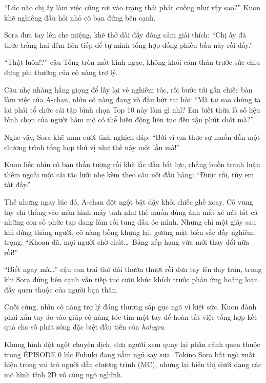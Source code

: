 \documentclass[../main.tex]{subfiles}
\begin{document}
``Lúc nào chị ấy làm việc cũng rơi vào trạng thái phát cuồng như vậy sao?'' Kuon khẽ nghiêng đầu hỏi nhỏ cô bạn đứng bên cạnh.

Sora đưa tay lên che miệng, khẽ thở dài đầy đồng cảm giải thích: ``Chị ấy đã thức trắng hai đêm liên tiếp để tự mình tổng hợp đống phiếu bầu này rồi đấy.''

``Thật luôn!?'' cậu Tổng tròn mắt kinh ngạc, không khỏi cảm thán trước sức chịu đựng phi thường của cô nàng trợ lý.

Cậu nhẹ nhàng hắng giọng để lấy lại vẻ nghiêm túc, rồi bước tới gần chiếc bàn làm việc của A-chan, nhìn cô nàng đang vò đầu bứt tai hỏi: ``Mà tại sao chúng ta lại phải tổ chức cái tập bình chọn Top 10 này làm gì nhỉ? Em biết thừa là số liệu bình chọn của người hâm mộ có thể biến động liên tục đến tận phút chót mà?''

Nghe vậy, Sora khẽ mỉm cười tinh nghịch đáp: ``Bởi vì em thực sự muốn dẫn một chương trình tổng hợp thú vị như thế này một lần mà!''

Kuon liếc nhìn cô bạn thần tượng rồi khẽ lắc đầu bất lực, chẳng buồn tranh luận thêm ngoài một cái tặc lưỡi nhẹ kèm theo câu nói đầu hàng: ``Được rồi, tùy em tất đấy.''

Thế nhưng ngay lúc đó, A-chan đột ngột bật dậy khỏi chiếc ghế xoay. Cô vung tay chỉ thẳng vào màn hình máy tính như thể muốn dùng ánh mắt xé nát tất cả những con số phức tạp đang làm rối tung đầu óc mình. Nhưng chỉ một giây sau khi đứng thẳng người, cô nàng bỗng khựng lại, gương mặt biến sắc đầy nghiêm trọng: ``Khoan đã, mọi người chờ chút\dots\ Bảng xếp hạng vừa mới thay đổi nữa rồi!''

``Biết ngay mà\dots'' cậu con trai thở dài thườn thượt rồi đưa tay lên day trán, trong khi Sora đứng bên cạnh vẫn tiếp tục cười khúc khích trước phản ứng hoảng loạn đầy quen thuộc của người bạn thân.

Cuối cùng, nhìn cô nàng trợ lý đáng thương sắp gục ngã vì kiệt sức, Kuon đành phải xắn tay áo vào giúp cô nàng tóc tím một tay để hoàn tất việc tổng hợp kết quả cho số phát sóng đặc biệt đầu tiên của \textit{hologra}.

\il

Khung hình đột ngột chuyển dịch, đưa người xem quay lại phân cảnh quen thuộc trong {\flaregothic ÉPISODE 0} lúc Fubuki đang nằm ngủ say sưa. Tokino Sora bất ngờ xuất hiện trong vai trò người dẫn chương trình (MC), nhưng lại hiển thị dưới dạng các mô hình tĩnh 2D vô cùng ngộ nghĩnh.

\end{document}
